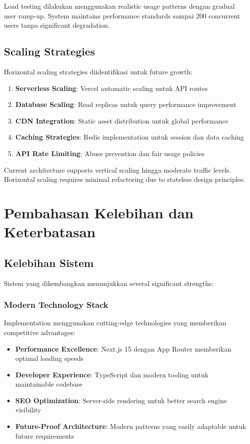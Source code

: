 Load testing dilakukan menggunakan realistic usage patterns dengan gradual user ramp-up. System maintains performance standards sampai 200 concurrent users tanpa significant degradation.

\subsection{Scaling Strategies}

Horizontal scaling strategies diidentifikasi untuk future growth:

\begin{enumerate}
\item \textbf{Serverless Scaling}: Vercel automatic scaling untuk API routes
\item \textbf{Database Scaling}: Read replicas untuk query performance improvement
\item \textbf{CDN Integration}: Static asset distribution untuk global performance
\item \textbf{Caching Strategies}: Redis implementation untuk session dan data caching
\item \textbf{API Rate Limiting}: Abuse prevention dan fair usage policies
\end{enumerate}

Current architecture supports vertical scaling hingga moderate traffic levels. Horizontal scaling requires minimal refactoring due to stateless design principles.

\section{Pembahasan Kelebihan dan Keterbatasan}

\subsection{Kelebihan Sistem}

Sistem yang dikembangkan menunjukkan several significant strengths:

\subsubsection{Modern Technology Stack}

Implementation menggunakan cutting-edge technologies yang memberikan competitive advantages:

\begin{itemize}
\item \textbf{Performance Excellence}: Next.js 15 dengan App Router memberikan optimal loading speeds
\item \textbf{Developer Experience}: TypeScript dan modern tooling untuk maintainable codebase
\item \textbf{SEO Optimization}: Server-side rendering untuk better search engine visibility
\item \textbf{Future-Proof Architecture}: Modern patterns yang easily adaptable untuk future requirements
\end{itemize}


